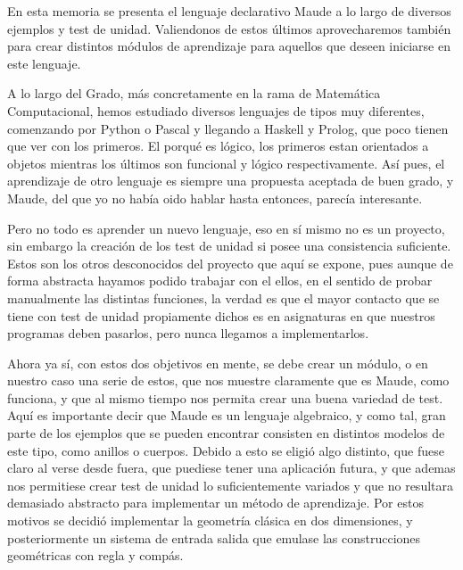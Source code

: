 
En esta memoria se presenta el lenguaje declarativo Maude a lo largo de diversos ejemplos y test de unidad. Valiendonos de estos últimos aprovecharemos también para crear distintos módulos de aprendizaje para aquellos que deseen iniciarse en este lenguaje.\par

A lo largo del Grado, más concretamente en la rama de Matemática Computacional, hemos estudiado diversos lenguajes de tipos muy diferentes, comenzando por Python o Pascal y llegando a Haskell y Prolog, que poco tienen que ver con los primeros. El porqué es lógico, los primeros estan orientados a objetos mientras los últimos son funcional y lógico respectivamente. Así pues, el aprendizaje de otro lenguaje es siempre una propuesta aceptada de buen grado, y Maude, del que yo no había oido hablar hasta entonces, parecía interesante.\par

Pero no todo es aprender un nuevo lenguaje, eso en sí mismo no es un proyecto, sin embargo la creación de los test de unidad si posee una consistencia suficiente. Estos son los otros desconocidos del proyecto que aquí se expone, pues aunque de forma abstracta hayamos podido trabajar con el ellos, en el sentido de probar manualmente las distintas funciones, la verdad es que el mayor contacto que se tiene con test de unidad propiamente dichos es en asignaturas en que nuestros programas deben pasarlos, pero nunca llegamos a implementarlos. \par

Ahora ya sí, con estos dos objetivos en mente, se debe crear un módulo, o en nuestro caso una serie de estos, que nos muestre claramente que es Maude, como funciona, y que al mismo tiempo nos permita crear una buena variedad de test. Aquí es importante decir que Maude es un lenguaje algebraico, y como tal, gran parte de los ejemplos que se pueden encontrar consisten en distintos modelos de este tipo, como anillos o cuerpos. Debido a esto se eligió algo distinto, que fuese claro al verse desde fuera, que puediese tener una aplicación futura, y que ademas nos permitiese crear test de unidad lo suficientemente variados y que no resultara demasiado abstracto para implementar un método de aprendizaje. Por estos motivos se decidió implementar la geometría clásica en dos dimensiones, y posteriormente un sistema de entrada salida que emulase las construcciones geométricas con regla y compás. \par

